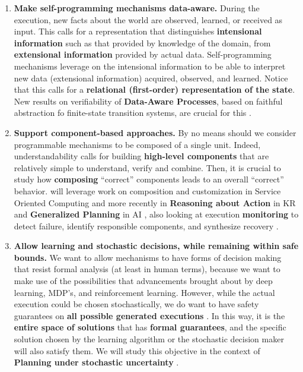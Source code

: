 \begin{enumerate}
\item \textbf{Make self-programming mechanisms data-aware.}
  During the execution, new facts about the world are observed,
  learned, or received as input. This calls for a representation that
  distinguishes \textbf{intensional information} such as that provided
  by knowledge of the domain, from \textbf{extensional information}
  provided by actual data. Self-programming mechanisms leverage on the
  intensional information to be able to interpret new data
  (extensional information) acquired, observed, and learned.  Notice that
  this calls for a \textbf{relational (first-order) representation of
    the state}.  New results on verifiability of \textbf{Data-Aware
    Processes}, based on faithful abstraction fo finite-state
  transition systems, are
  crucial for this \cite{ClassenL08,HaririCGDM13,ClassenLLZ14,HullSV13,BelardinelliLP14,DeGLP16,CDMP17}.


\item \textbf{Support component-based approaches.}  
  By no means should we consider programmable mechanisms to be
  composed of a single unit.  Indeed, understandability calls for
  building \textbf{high-level components} that are relatively simple
  to understand, verify and combine. Then, it is crucial to study how
  \textbf{composing} ``correct'' components leads to an overall
  ``correct'' behavior. 
\project will leverage  work on composition and customization in Service Oriented Computing and more recently in \textbf{Reasoning about Action} in KR and \textbf{Generalized Planning} in AI
 \cite{wsf2014,SohrabiPM09,BertoliPT10,DePS13,DeGGPSS16}, %
also looking at execution \textbf{monitoring} to detect 
failure, identify responsible components, and synthesize recovery \cite{DeGMGMM14,MarrellaMS17}.



\item \textbf{Allow learning and stochastic decisions, while remaining within safe bounds.}
We want to allow mechanisms to have forms of decision making that
resist formal analysis (at least in human terms), because we want to
make use of the possibilities that advancements brought about by deep learning,
MDP's, and reinforcement learning. However, while the
actual execution could be chosen stochastically, we do want to have
safety guarantees on \textbf{all possible generated executions}
\cite{AmodeiOSCSM16,TYLC16,Hadfield-Menell16a}.  In this way, it is
the \textbf{entire space of solutions} that has \textbf{formal
  guarantees}, and the specific solution chosen by the learning
algorithm or the stochastic decision maker will also satisfy them. We
will study this objective in the context of \textbf{Planning
under stochastic uncertainty} \cite{GeffnerBo13,GNT2016}.

\end{enumerate}


